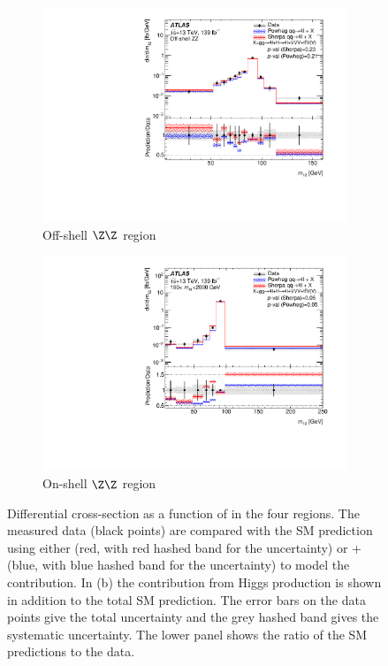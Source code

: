 \begin{figure}[htb!]
\begin{subfigure}{.49\textwidth}
      \includegraphics[width=.99\linewidth]{Figures/m4l/UnfoldedResults/Unfolded_Data_m12_m4loffshell.pdf}  
      \caption{Off-shell $\Z\Z$ region}
      \label{fig:sub-third}
    \end{subfigure}
    \begin{subfigure}{.49\textwidth}
      \centering
      \includegraphics[width=.99\linewidth]{Figures/m4l/UnfoldedResults/Unfolded_Data_m12_m4l180-2000.pdf}  
      \caption{On-shell $\Z\Z$ region}
      \label{fig:sub-fourth}
    \end{subfigure}
    \caption{Differential cross-section as a function of \mZOne{} in the four
        \mFourL{} regions. The measured data (black points) are  compared with the SM prediction using either \SHERPA{} (red, with red hashed band for the uncertainty) or \POWHEG{} + \pythia{} (blue, with blue hashed band for the uncertainty) to model the \qqFourL{} contribution. In (b) the contribution from Higgs production is shown in addition to the total SM prediction. The error bars on the data points give the total uncertainty and the grey hashed band gives the systematic uncertainty. \Pvalue{} The  lower panel shows the ratio of the SM predictions to the data.}
    \label{fig:m12_m4l}
\end{figure}

